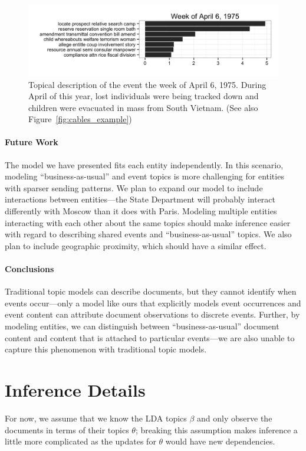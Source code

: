 \begin{figure}[ht]
\centering
\includegraphics[width=\textwidth]{fig/saigon_apr6.png}
\caption{Topical description of the event the week of April 6, 1975.  During April of this year, lost individuals were being tracked down and children were evacuated in mass from South Vietnam. (See also Figure~\ref{fig:cables_example})}
\label{fig:saigon_april}
\end{figure}

\paragraph{Future Work}  The model we have presented fits each entity independently. In this scenario, modeling ``business-as-usual'' and event topics is more challenging for entities with sparser sending patterns.
We plan to expand our model to include interactions between entities---the State Department will probably interact differently with Moscow than it does with Paris.
Modeling multiple entities interacting with each other about the same topics should make inference easier with regard to describing shared events and ``business-as-usual'' topics.  We also plan to include geographic proximity, which should have a similar effect.

\paragraph{Conclusions} Traditional topic models can describe documents, but they cannot identify when events occur---only a model like ours that explicitly models event occurrences and event content can attribute document observations to discrete events.  Further, by modeling entities, we can distinguish between ``business-as-usual'' document content and content that is attached to particular events---we are also unable to capture this phenomenon with traditional topic models.








\newpage
\appendix
\section{Inference Details}
\label{sec:appendix_inference}
For now, we assume that we know the LDA topics $\beta$ and only observe the documents in terms of their topics $\theta$; breaking this assumption makes inference a little more complicated as the updates for $\theta$ would have new dependencies.


